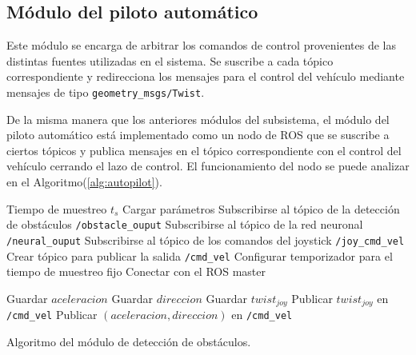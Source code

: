     \subsection{Módulo del piloto automático}
    Este módulo se encarga de arbitrar los comandos de control provenientes de las distintas fuentes utilizadas en el sistema. Se 
    suscribe a cada tópico correspondiente y redirecciona los mensajes para el control del vehículo mediante mensajes de tipo 
    \lstinline{geometry_msgs/Twist}.

    De la misma manera que los anteriores módulos del subsistema, el módulo del piloto automático está implementado como un nodo 
    de ROS que se suscribe a ciertos tópicos y publica mensajes en el tópico correspondiente con el control del vehículo cerrando 
    el lazo de control. El funcionamiento del nodo se puede analizar en el Algoritmo(\ref{alg:autopilot}).

    \begin{algorithm}
        \begin{algorithmic}[1]
        \REQUIRE Tiempo de muestreo $t_s$
        \STATE Cargar parámetros 
        \STATE Subscribirse al tópico de la detección de obstáculos \lstinline{/obstacle_ouput}
        \STATE Subscribirse al tópico de la red neuronal \lstinline{/neural_ouput}
        \STATE Subscribirse al tópico de los comandos del joystick \lstinline{/joy_cmd_vel}
        \STATE Crear tópico para publicar la salida \lstinline{/cmd_vel}
        \STATE Configurar temporizador para el tiempo de muestreo fijo
        \STATE Conectar con el ROS master
        
                \STATE Guardar $aceleracion$
            \ENDIF
                \STATE Guardar $direccion$
            \ENDIF
                \STATE Guardar $twist_{joy}$
            \ENDIF
                    \STATE Publicar $twist_{joy}$ en \lstinline{/cmd_vel}
                \ELSE
                    \STATE Publicar $(aceleracion, direccion)$ en \lstinline{/cmd_vel}
                \ENDIF
            \ENDIF

        \ENDWHILE
        \end{algorithmic}
        \caption{Algoritmo del módulo de detección de obstáculos.}\label{alg:autopilot}
    \end{algorithm}

